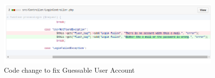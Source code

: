 \begin{figure}[ht]
	\centering
	\includegraphics[width=.8\linewidth]{figures/fix_guessable_account.png}
	\caption{Code change to fix Guessable User Account}
	\label{fig:fix_guessable_account}
\end{figure}

\clearpage